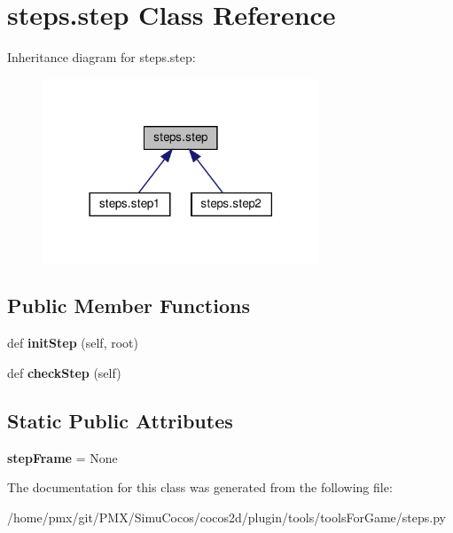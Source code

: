 \hypertarget{classsteps_1_1step}{}\section{steps.\+step Class Reference}
\label{classsteps_1_1step}


Inheritance diagram for steps.\+step\+:
\nopagebreak
\begin{figure}[H]
\begin{center}
\leavevmode
\includegraphics[width=234pt]{classsteps_1_1step__inherit__graph}
\end{center}
\end{figure}
\subsection*{Public Member Functions}
\begin{DoxyCompactItemize}
\item 
\mbox{\label{classsteps_1_1step_a5d04a96182bcf19dd0aadb776e1eedba}} 
def {\bfseries init\+Step} (self, root)
\item 
\mbox{\label{classsteps_1_1step_a226e8a7566dca7eb971b41a4e0e3b68f}} 
def {\bfseries check\+Step} (self)
\end{DoxyCompactItemize}
\subsection*{Static Public Attributes}
\begin{DoxyCompactItemize}
\item 
\mbox{\label{classsteps_1_1step_a5098f5f5287f7b6cbfe88330137b8bf0}} 
{\bfseries step\+Frame} = None
\end{DoxyCompactItemize}


The documentation for this class was generated from the following file\+:\begin{DoxyCompactItemize}
\item 
/home/pmx/git/\+P\+M\+X/\+Simu\+Cocos/cocos2d/plugin/tools/tools\+For\+Game/steps.\+py\end{DoxyCompactItemize}
